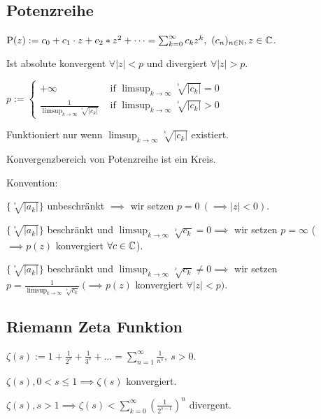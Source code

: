\subsection{Potenzreihe}
$\text{P}(z) := c_0 + c_1 \cdot z + c_2 * z^2 + \dots = \sum_{k=0}^{\infty} c_k z^k, \ (c_n)_{n \in \mathbb{N}}, z \in \mathbb{C}$.
\begin{compactitem}
    \item Ist absolute konvergent $\forall |z| < p$ und divergiert $\forall |z| > p$.
    \item $
        p:= \begin{cases}
            +\infty & \text{ if } \limsup_{k \to \infty} \sqrt[^k]{\left| c_k \right| }  = 0\\
            \frac{1}{\limsup_{k \to \infty} \sqrt[^k]{|c_k|}} & \text{ if } \limsup_{k \to \infty} \sqrt[^k]{|c_k|} > 0
        \end{cases} 
    $
    \item Funktioniert nur wenn $\limsup_{k \to \infty} \sqrt[^k]{|c_k|}$ existiert.
    \item Konvergenzbereich von Potenzreihe ist ein Kreis.
\end{compactitem}
Konvention:
\begin{compactenum}
\item $\{\sqrt[^n]{ \left| a_k \right| } \}$ unbeschränkt $\implies$ wir setzen $p=0 \ (\implies |z| < 0)$.
\item $\{\sqrt[^n]{ \left| a_k \right| } \}$ beschränkt und $\limsup_{k \to \infty} \sqrt[^k]{c_k}=0 \implies$ wir setzen $p=\infty$ ($\implies p(z)$ konvergiert $\forall c \in \mathbb{C}$).
\item $\{\sqrt[^n]{ \left| a_k \right| } \}$ beschränkt und $\limsup_{k \to \infty} \sqrt[^k]{c_k}\neq 0 \implies$ wir setzen $p= \frac{1}{\limsup_{k \to \infty} \sqrt[^k]{c_k}} \ (\implies p(z)$ konvergiert $\forall |z| < p)$.
\end{compactenum}

\subsection{Riemann Zeta Funktion}
$\zeta(s) := 1 + \frac{1}{2^s} + \frac{1}{3^s} + \dots = \sum_{n=1}^{\infty} \frac{1}{n^s}, \ s > 0$.
\begin{compactitem}
    \item $\zeta(s), 0 < s \le 1 \implies \zeta(s)$ konvergiert.
    \item $\zeta(s), s > 1 \implies \zeta(s) < \sum_{k=0}^{\infty} \left( \frac{1}{2^{s-1}} \right)^n $ divergent.
\end{compactitem}

